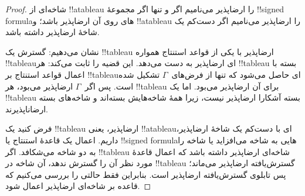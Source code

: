 \documentclass[../../../include/open-logic-section]{subfiles}
\begin{document}
\begin{proof}
شاخه‌ای از !!a{tableau} را ارضاپذیر می‌نامیم اگر و تنها اگر مجموعهٔ
!!{signed formula}های روی آن ارضاپذیر باشد؛ و !!a{tableau} را ارضاپذیر
می‌نامیم اگر دست‌کم یک شاخهٔ ارضاپذیر داشته باشد.

نشان می‌دهیم: گسترش یک !!{tableau} ارضاپذیر با یکی از قواعد استنتاج
همواره !!{tableau}ای ارضاپذیر به دست می‌دهد. این قضیه را ثابت می‌کند:
هر !!{tableau} بسته با اعمال قواعد استنتاج بر !!{tableau}ای حاصل
می‌شود که تنها از فرض‌های~$\Gamma$ تشکیل شده است. پس اگر~$\Gamma$
ارضاپذیر می‌بود، هر !!{tableau} برای آن ارضاپذیر می‌بود. اما یک
!!{tableau} بسته آشکارا ارضاپذیر نیست، زیرا همهٔ شاخه‌هایش بسته‌اند و
شاخه‌های بسته ارضاناپذیرند.

فرض کنید یک !!{tableau} ارضاپذیر، یعنی !!a{tableau}ای با دست‌کم یک
شاخهٔ ارضاپذیر، داریم. اعمال یک قاعدهٔ استنتاج یا !!{signed formula}هایی
به شاخه می‌افزاید یا شاخه را به دو شاخه می‌شکافد. اگر !!{tableau}
شاخه‌ای ارضاپذیر داشته باشد که اعمال قاعدهٔ مورد نظر آن را گسترش ندهد،
آن شاخه در !!{tableau} گسترش‌یافته ارضاپذیر می‌ماند؛ پس تابلوی
گسترش‌یافته ارضاپذیر است. بنابراین فقط حالتی را بررسی می‌کنیم که قاعده
بر شاخه‌ای ارضاپذیر اعمال شود.


\end{proof}
\end{document}
